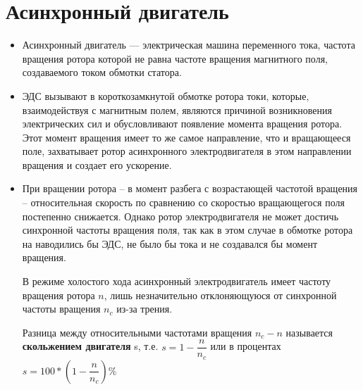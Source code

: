 \section{Асинхронный двигатель}

\begin{itemize}
\item
Асинхронный двигатель --- электрическая машина переменного тока, частота вращения ротора которой не равна частоте вращения магнитного поля, создаваемого током обмотки статора.

\item
ЭДС вызывают в короткозамкнутой обмотке ротора токи, которые, взаимодействуя с магнитным полем, являются причиной возникновения электрических сил и обусловливают появление момента вращения ротора. Этот момент вращения имеет то же самое направление, что и вращающееся поле, захватывает ротор асинхронного электродвигателя в этом направлении вращения и создает его ускорение.

\item
При вращении ротора -- в момент разбега с возрастающей частотой вращения -- относительная скорость по сравнению со скоростью вращающегося поля постепенно снижается. Однако ротор электродвигателя не может достичь синхронной частоты вращения поля, так как в этом случае в обмотке ротора на наводились бы ЭДС, не было бы тока и не создавался бы момент вращения.

В режиме холостого хода асинхронный электродвигатель имеет частоту вращения ротора $ n $, лишь незначительно отклоняющуюся от синхронной частоты вращения $ n_c $ из-за трения. 

Разница между относительными частотами вращения $ n_c - n $ называется \textbf{скольжением двигателя} s, т.е. $ s = 1 - \dfrac{n}{n_c} $ или в процентах $ s = 100 * (1- \dfrac{n}{n_c})\% $

\end{itemize}
